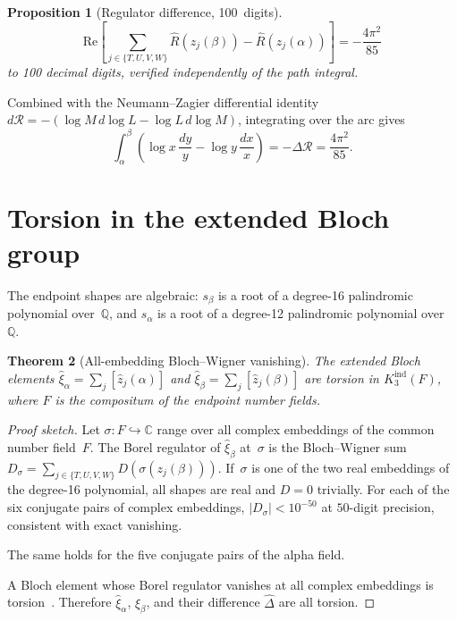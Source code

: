 \documentclass[11pt]{article}
\newtheorem{theorem}{Theorem}
\newtheorem{proposition}[theorem]{Proposition}
\theoremstyle{remark}
\begin{document}
\begin{proposition}[Regulator difference, 100~digits]
\label{prop:regulator}
\[
\mathrm{Re}\!\left[\sum_{j \in \{T,U,V,W\}}
\hat{R}(z_j(\beta)) - \hat{R}(z_j(\alpha))\right]
= -\frac{4\pi^2}{85}
\]
to 100 decimal digits, verified independently of the
path integral.
\end{proposition}

Combined with the Neumann--Zagier differential identity
$d\mathcal{R} = -(\log M\,d\!\log L
- \log L\,d\!\log M)$,
integrating over the arc gives
\[
\int_\alpha^\beta
\left(\log x\,\frac{dy}{y}
- \log y\,\frac{dx}{x}\right)
= -\Delta\mathcal{R} = \frac{4\pi^2}{85}.
\]

\section{Torsion in the extended Bloch group}

The endpoint shapes are algebraic: $s_\beta$ is a root of a
degree-16 palindromic polynomial over~$\mathbb{Q}$, and
$s_\alpha$ is a root of a degree-12 palindromic polynomial
over~$\mathbb{Q}$.

\begin{theorem}[All-embedding Bloch--Wigner vanishing]
\label{thm:torsion}
The extended Bloch elements
$\widehat{\xi}_\alpha = \sum_j [\widehat{z}_j(\alpha)]$ and
$\widehat{\xi}_\beta = \sum_j [\widehat{z}_j(\beta)]$
are torsion in $K_3^{\mathrm{ind}}(F)$, where $F$ is the
compositum of the endpoint number fields.
\end{theorem}

\begin{proof}[Proof sketch]
Let $\sigma : F \hookrightarrow \mathbb{C}$ range over all
complex embeddings of the common number field~$F$.  The
Borel regulator of $\widehat{\xi}_\beta$ at~$\sigma$ is the
Bloch--Wigner sum
$D_\sigma = \sum_{j \in \{T,U,V,W\}} D(\sigma(z_j(\beta)))$.
If~$\sigma$ is one of the two real embeddings of the degree-16
polynomial, all shapes are real and $D = 0$ trivially.
For each of the six conjugate pairs of complex embeddings,
$|D_\sigma| < 10^{-50}$ at $50$-digit precision, consistent
with exact vanishing.

The same holds for the five conjugate pairs of the alpha
field.

A Bloch element whose Borel regulator vanishes at all
complex embeddings is torsion~\cite{Neumann2004,Zickert2009}.
Therefore $\widehat{\xi}_\alpha$, $\widehat{\xi}_\beta$,
and their difference $\widehat{\Delta}$ are all torsion.
\end{proof}
\end{document}
